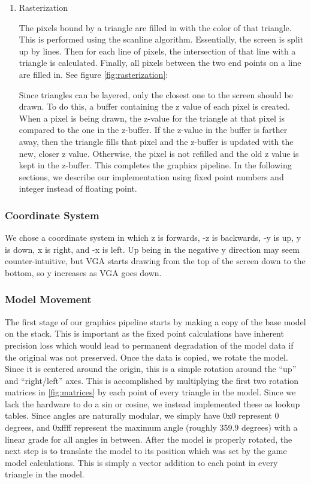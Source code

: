 \documentclass[onecolumn]{IEEEtran}
\begin{document}
\begin{enumerate}
\item Rasterization

The pixels bound by a triangle are filled in with the color of that triangle.  This is performed using the scanline algorithm.  Essentially, the screen is split up by lines.  Then for each line of pixels, the intersection of that line with a triangle is calculated.  Finally, all pixels between the two end points on a line are filled in.  See figure \ref{fig:rasterization}:


Since triangles can be layered, only the closest one to the screen should be drawn.  To do this, a buffer containing the z value of each pixel is created.  When a pixel is being drawn, the z-value for the triangle at that pixel is compared to the one in the z-buffer.  If the z-value in the buffer is farther away, then the triangle fills that pixel and the z-buffer is updated with the new, closer z value.  Otherwise, the pixel is not refilled and the old z value is kept in the z-buffer.  This completes the graphics pipeline.  In the following sections, we describe our implementation using fixed point numbers and integer instead of floating point.

\end{enumerate}

\subsubsection{Coordinate System}
We chose a coordinate system in which z is forwards, -z is backwards, -y is up, y is down, x is right, and -x is left.  Up being in the negative y direction may seem counter-intuitive, but VGA starts drawing from the top of the screen down to the bottom, so y increases as VGA goes down.

\subsubsection{Model Movement}
The first stage of our graphics pipeline starts by making a copy of the base model on the stack.  This is important as the fixed point calculations have inherent precision loss which would lead to permanent degradation of the model data if the original was not preserved.  Once the data is copied, we rotate the model.  Since it is centered around the origin, this is a simple rotation around the “up” and “right/left” axes.  This is accomplished by multiplying the first two rotation matrices in \ref{fig:matrices} by each point of every triangle in the model.  Since we lack the hardware to do a sin or cosine, we instead implemented these as lookup tables.  Since angles are naturally modular, we simply have 0x0 represent 0 degrees, and 0xffff represent the maximum angle (roughly 359.9 degrees) with a linear grade for all angles in between.  After the model is properly rotated, the next step is to translate the model to its position which was set by the game model calculations.  This is simply a vector addition to each point in every triangle in the model.
\end{document}
